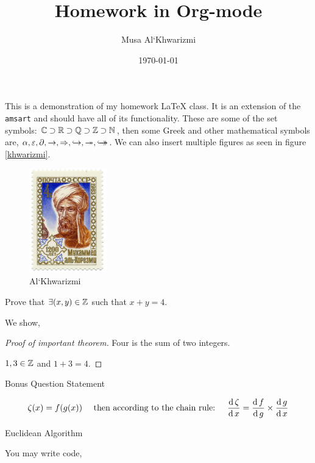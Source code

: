 \documentclass{homework}
\author{Musa Al`Khwarizmi}
\date{\today}
\title{Homework in Org-mode}
\begin{document}
\maketitle
This is a demonstration of my homework \LaTeX{} class. It is an extension of the \texttt{amsart} and should have all of its functionality. These are some of the set symbols: \(\bC \supset \bR \supset \bQ \supset \bZ \supset \bN\), then some Greek and other mathematical symbols are, \(\al, \ep, \p, \ra, \Ra, \injective, \surjective, \bijective\). We can also insert multiple figures as seen in figure \ref{khwarizmi}.

\begin{figure}[htbp]
\centering
\includegraphics[width=0.3\textwidth]{../media/khwarizmi.png}
\caption{\label{fig:org95e3976}
Al`Khwarizmi}
\end{figure}


\begin{question}
Prove that \(\exists (x,y) \in \bZ\) such that \(x+y = 4\).

We show,
\begin{proof}[Proof of important theorem]
Four is the sum of two integers.

\(1,3 \in \bZ\) and \(1+3=4\).
\end{proof}
\end{question}

\begin{bonus}
Bonus Question Statement 

\lipsum[2]
\[
    \zeta(x) = f(g(x)) \quad \text{ then according to the chain rule: } \quad
    \derivative{\zeta} = \derivative[g]{f} \times \derivative{g}
  \]
\end{bonus}


\begin{bonus}
Euclidean Algorithm

You may write code,

\end{bonus}
\end{document}
